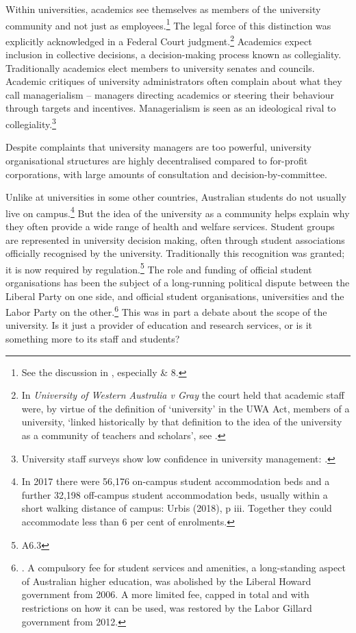 \documentclass{grattan}
\begin{document}
Within universities, academics see themselves as members of the university community and not just as employees.\footnote{See the discussion in \textcite[][]{Forsyth2014ahistoryofthemo}, especially  \& 8.} The legal force of this distinction was explicitly acknowledged in a Federal Court judgment.\footnote{In \emph{University of Western Australia v Gray} the court held that academic staff were, by virtue of the definition of `university' in the UWA Act, members of a university, `linked historically by that definition to the idea of the university as a community of teachers and scholars', see \textcite[][]{Stobbs2015academicfreedoman}.} Academics expect inclusion in collective decisions, a decision-making process known as collegiality. Traditionally academics elect members to university senates and councils. Academic critiques of university administrators often complain about what they call managerialism -- managers directing academics or steering their behaviour through targets and incentives. Managerialism is seen as an ideological rival to collegiality.\footnote{University staff surveys show low confidence in university management: \textcite[][]{NTEU20182017stateoftheun}.}

Despite complaints that university managers are too powerful, university organisational structures are highly decentralised compared to for-profit corporations, with large amounts of consultation and decision-by-committee.

Unlike at universities in some other countries, Australian students do not usually live on campus.\footnote{In 2017 there were 56,176 on-campus student accommodation beds and a further 32,198 off-campus student accommodation beds, usually within a short walking distance of campus: Urbis (2018), p iii. Together they could accommodate less than 6 per cent of enrolments.} But the idea of the university as a community helps explain why they often provide a wide range of health and welfare services. Student groups are represented in university decision making, often through student associations officially recognised by the university. Traditionally this recognition was granted; it is now required by regulation.\footnote{\textcites[][]{DIICCSRTE2013studentservicesa}[][]{DepartmentofEducationandTraining2015highereducationre}A6.3} The role and funding of official student organisations has been the subject of a long-running political dispute between the Liberal Party on one side, and official student organisations, universities and the Labor Party on the other.\footnote{\textcite[][]{Norton2005thefreemarketcas}. A compulsory fee for student services and amenities, a long-standing aspect of Australian higher education, was abolished by the Liberal Howard government from 2006. A more limited fee, capped in total and with restrictions on how it can be used, was restored by the Labor Gillard government from 2012.} This was in part a debate about the scope of the university. Is it just a provider of education and research services, or is it something more to its staff and students?
\end{document}
